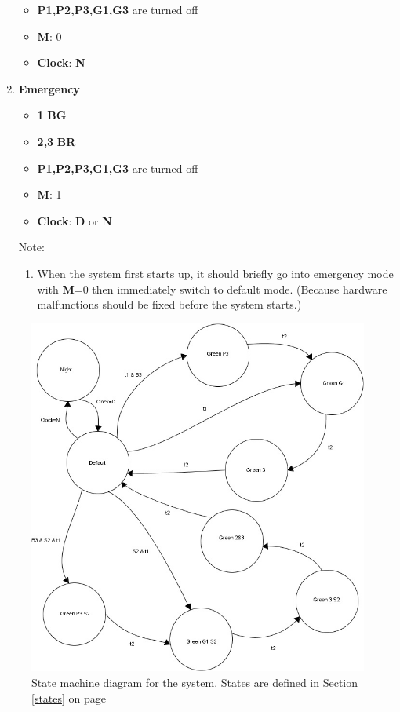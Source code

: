 \documentclass[letterpaper]{article}
\begin{document}
\begin{enumerate}
\begin{itemize}
        \item \textbf{P1,P2,P3,G1,G3} are turned off
        \item \textbf{M}: 0
        \item \textbf{Clock}: \textbf{N}
       \end{itemize}
 \item \textbf{Emergency}
       \begin{itemize}
        \item {\color{green}\textbf{1}} \textbf{BG}
        \item {\color{red}\textbf{2,3}} \textbf{BR}
        \item \textbf{P1,P2,P3,G1,G3} are turned off
        \item \textbf{M}: 1
        \item \textbf{Clock}: \textbf{D} or \textbf{N}
       \end{itemize}
       Note:
       \begin{enumerate}
        \item When the system first starts up, it should briefly go into emergency mode
              with \textbf{M}=0 then immediately switch to default mode.
              (Because hardware malfunctions should be fixed before the system starts.)
       \end{enumerate}
\end{enumerate}

\begin{figure}[h]
 \centering
 \includegraphics[width=\textwidth]{fsm.jpg}
 \caption{State machine diagram for the system. States are defined in Section \ref{states} on page \pageref{states}}
 \label{fsm}
\end{figure}
\end{document}
